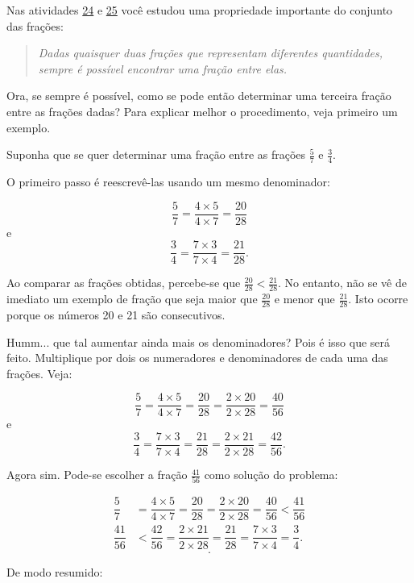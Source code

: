 \begin{refletindo*}{}

  Nas atividades \hyperref[chap4-ativ24]{24} e \hyperref[chap4-ativ25]{25} você estudou uma propriedade importante do conjunto das frações:

\begin{quote}
\textit{Dadas quaisquer duas frações que representam diferentes quantidades, sempre é possível encontrar uma  fração entre elas.}
\end{quote}


  Ora, se sempre é possível, como se pode então determinar uma terceira fração entre as frações dadas? Para explicar melhor o procedimento, veja primeiro um exemplo.

  Suponha que se quer determinar uma fração entre as frações   $\frac{5}{7}$ e   $\frac{3}{4}$.

  O primeiro passo é reescrevê-las usando um mesmo denominador:

  $$\dfrac{5}{7} = \dfrac{4 \times 5}{ 4 \times 7} = \dfrac{20}{28}$$
  e
  $$\dfrac{3}{4} = \dfrac{7 \times 3}{ 7 \times 4} = \dfrac{21}{28}.$$

  Ao comparar as frações obtidas, percebe-se que   $\frac{20}{28}<\frac{21}{28}$. No entanto, não se vê de imediato um exemplo de fração que seja maior que   $\frac{20}{28}$ e menor que   $\frac{21}{28}$. Isto ocorre porque os números 20 e 21 são consecutivos.

  Humm... que tal aumentar ainda mais os denominadores? Pois é isso que será feito.  Multiplique por dois os numeradores e denominadores de cada uma das frações. Veja:

  $$\dfrac{5}{7} = \dfrac{4 \times 5}{ 4 \times 7} = \dfrac{20}{28} = \dfrac{2 \times 20}{ 2 \times 28} = \dfrac{40}{56}$$
  e
  $$\dfrac{3}{4} = \dfrac{7 \times 3}{ 7 \times 4} = \dfrac{21}{28} = \dfrac{2 \times 21}{2 \times 28} = \dfrac{42}{56}.$$

  Agora sim. Pode-se escolher a fração   $\frac{41}{56}$ como solução do problema:

\begin{align*}
\dfrac{5}{7}&= \dfrac{4 \times 5}{ 4 \times 7} = \dfrac{20}{28} = \dfrac{2 \times 20}{ 2 \times 28} = \dfrac{40}{56} < \dfrac{41}{56} \\[1ex]
\dfrac{41}{56}&< \dfrac{42}{56} = \dfrac{2 \times 21}{2 \times 28} =  \dfrac{21}{28} = \dfrac{7 \times 3}{ 7 \times 4} = \dfrac{3}{4}.
\end{align*}
  $$ .$$

  De modo resumido:


\end{refletindo*}
